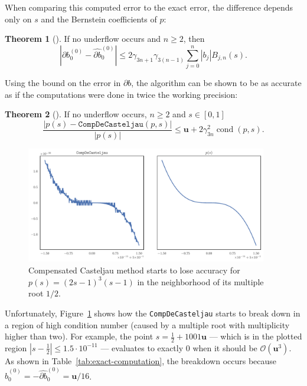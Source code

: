 \documentclass[letterpaper,10pt]{article}
\theoremstyle{definition}
\newtheorem{theorem}{Theorem}
\newcommand{\cond}[1]{\operatorname{cond}\left(#1\right)}
\newcommand{\mach}{\mathbf{u}}
\begin{document}
\noindent  When comparing this computed error to the exact error, the
difference depends only on \(s\) and the Bernstein
coefficients of \(p\):

\begin{theorem}[\cite{Jiang2010}]
  If no underflow occurs and \(n \geq 2\), then
  \begin{equation}
    \left|\partial b_0^{(0)} - \widehat{\partial b}_0^{(0)}\right| \leq
    2 \gamma_{3n + 1} \gamma_{3(n - 1)}
    \sum_{j = 0}^n \left|b_j\right| B_{j, n}(s).
  \end{equation}
\end{theorem}

\noindent Using the bound on the error in \(\partial b\), the algorithm can
be shown to be as accurate as if the computations were done in twice
the working precision:

\begin{theorem}[\cite{Jiang2010}]
  If no underflow occurs, \(n \geq 2\) and \(s \in \left[0, 1\right]\)
  \begin{equation}
    \frac{\left|p(s) - \mathtt{CompDeCasteljau}(p, s)\right|}{\left|p(s)\right|} \leq \mach +
    2 \gamma_{3n}^2 \cond{p, s}.
  \end{equation}
\end{theorem}

\begin{figure}
  \includegraphics[width=0.9375\textwidth]{../images/compensated_insufficient.pdf}
  \centering
  \caption{Compensated Casteljau method starts to lose accuracy
    for \(p(s) = (2s - 1)^3 (s - 1)\) in the neighborhood of its
    multiple root \(1/2\).}
  \label{fig:compensated-insufficient}
\end{figure}

Unfortunately, Figure~\ref{fig:compensated-insufficient} shows how
the \texttt{CompDeCasteljau} starts to break down in a region of
high condition number (caused by a multiple root with multiplicity
higher than two). For example, the point
\(s = \frac{1}{2} + 1001\mach\)
--- which is in the plotted region \(\left|s - \frac{1}{2}\right|
\leq 1.5 \cdot 10^{-11}\) --- evaluates to exactly \(0\) when it should be
\(\mathcal{O}\left(\mach^3\right)\). As shown in
Table~\ref{tab:exact-computation}, the breakdown occurs because
\(\widehat{b}_0^{(0)} = -\widehat{\partial b}_0^{(0)} = \mach / 16\).
\end{document}
